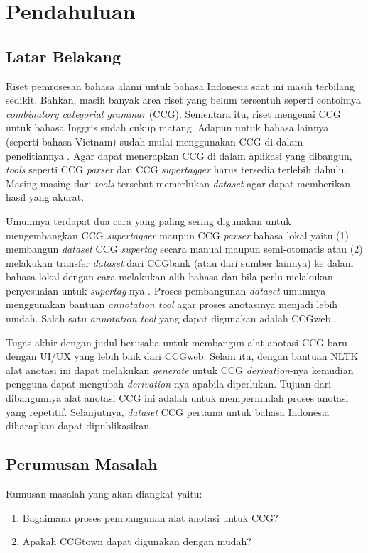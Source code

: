 \chapter{Pendahuluan}
\section{Latar Belakang}

Riset pemrosesan bahasa alami untuk bahasa Indonesia saat ini masih terbilang sedikit.
Bahkan, masih banyak area riset yang belum tersentuh seperti contohnya
\textit{combinatory categorial grammar} (CCG).
Sementara itu, riset mengenai CCG untuk bahasa Inggris sudah cukup matang.
Adapun untuk bahasa lainnya (seperti bahasa Vietnam) sudah mulai menggunakan CCG di dalam
penelitiannya \cite{nguyen2019vietnamese}.
Agar dapat menerapkan CCG di dalam aplikasi yang dibangun, \textit{tools} seperti
CCG \textit{parser} dan CCG \textit{supertagger} harus tersedia terlebih dahulu.
Masing-masing dari \textit{tools} tersebut memerlukan \textit{dataset} agar dapat memberikan
hasil yang akurat.

Umumnya terdapat dua cara yang paling sering digunakan untuk mengembangkan CCG \textit{supertagger}
maupun CCG \textit{parser} bahasa lokal yaitu (1) membangun \textit{dataset} CCG \textit{supertag}
secara manual maupun semi-otomatis atau (2) melakukan transfer \textit{dataset} dari CCGbank
(atau dari sumber lainnya) ke dalam bahasa lokal dengan cara melakukan alih bahasa dan bila perlu
melakukan penyesuaian untuk \textit{supertag}-nya \cite{hockenmaier-steedman-2007-ccgbank}.
Proses pembangunan \textit{dataset} umumnya menggunakan bantuan \textit{annotation tool} agar
proses anotasinya menjadi lebih mudah.
Salah satu \textit{annotation tool} yang dapat digunakan adalah
CCGweb \cite{evang-etal-2019-ccgweb}.

Tugas akhir dengan judul \say{\Title} berusaha untuk membangun alat anotasi CCG baru dengan
UI/UX yang lebih baik dari CCGweb.
Selain itu, dengan bantuan NLTK alat anotasi ini dapat melakukan \textit{generate} untuk
CCG \textit{derivation}-nya kemudian pengguna dapat mengubah \textit{derivation}-nya apabila
diperlukan.
Tujuan dari dibangunnya alat anotasi CCG ini adalah untuk mempermudah proses anotasi yang
repetitif.
Selanjutnya, \textit{dataset} CCG pertama untuk bahasa Indonesia diharapkan dapat dipublikasikan.
\pagebreak

\section{Perumusan Masalah}
Rumusan masalah yang akan diangkat yaitu:
\begin{enumerate}
    \item Bagaimana proses pembangunan alat anotasi untuk CCG?
    \item Apakah CCGtown dapat digunakan dengan mudah?
\end{enumerate}
